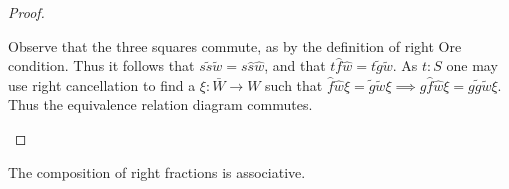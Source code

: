 \begin{proof}
\begin{center}
        \end{center}
        Observe that the three squares commute, as by the definition of right Ore condition. Thus it follows that $s\widetilde{s}\widetilde{w} = s\widehat{s}\widehat{w}$, and that $t\widehat{f}\widehat{w}=t\widetilde{g}\widetilde{w}$. As $t:S$ one may use right cancellation to find a $\xi:\bar{W}\rightarrow W$ such that $\widehat{f}\widehat{w}\xi = \widetilde{g}\widetilde{w}\xi \implies g\widehat{f}\widehat{w}\xi = g\widetilde{g}\widetilde{w}\xi$. Thus the equivalence relation diagram commutes.
        \begin{center}
        \end{center}
    \end{proof}

    \begin{prop}
        The composition of right fractions is associative.
    \end{prop}

